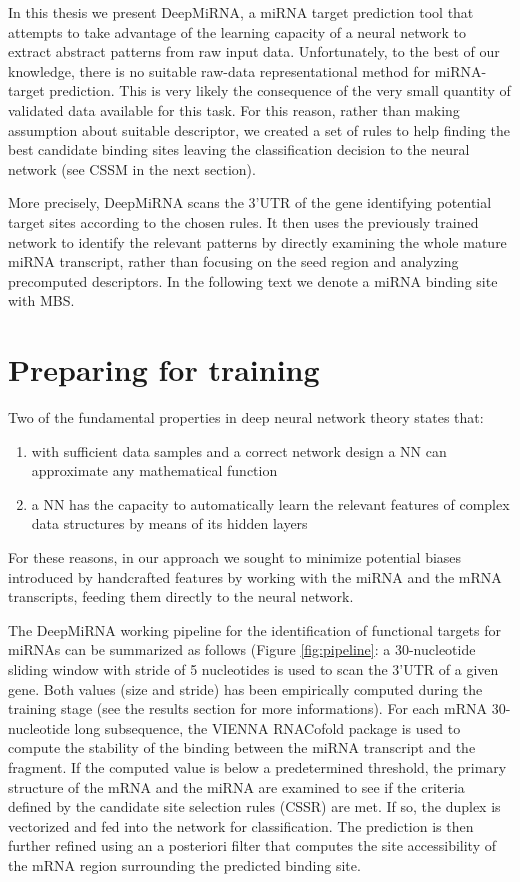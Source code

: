 In this thesis we present DeepMiRNA, a miRNA target prediction tool that attempts to take advantage of the learning capacity of a neural network to extract abstract patterns from raw input data. Unfortunately, to the best of our knowledge, there is no suitable raw-data representational method for miRNA-target prediction. This is very likely the consequence of the very small quantity of validated data available for this task. For this reason, rather than making assumption about suitable descriptor, we created a set of rules to help finding the best candidate binding sites leaving the classification decision to the neural network (see CSSM in the next section). 

More precisely, DeepMiRNA scans the 3'UTR of the gene identifying potential target sites according to the chosen rules. It then uses the previously trained network to identify the relevant patterns by directly examining the whole mature miRNA transcript, rather than focusing on the seed region and analyzing precomputed descriptors. In the following text we denote a miRNA binding site with MBS.

\section{Preparing for training}
Two of the fundamental properties in deep neural network theory states that:

\begin{enumerate}
	\item with sufficient data samples and a correct network design a NN can approximate any mathematical function
	\item a NN has the capacity to automatically learn the relevant features of complex data structures by means of its hidden layers \cite{dl}
\end{enumerate}

For these reasons, in our approach we sought to minimize potential biases introduced by handcrafted features by working  with the miRNA and the mRNA transcripts, feeding them directly to the neural network.

The DeepMiRNA working pipeline for the identification of functional targets for miRNAs can be summarized as follows (Figure \ref{fig:pipeline}: a 30-nucleotide sliding window with stride of 5 nucleotides is used to scan the 3'UTR of a given gene. Both values (size and stride) has been empirically computed during the training stage (see the results section for more informations). For each mRNA 30-nucleotide long subsequence, the VIENNA RNACofold package \cite{vienna_rna} is used to compute the stability of the binding between the miRNA transcript and the fragment. If the computed value is below a predetermined threshold, the primary structure of the mRNA and the miRNA are examined to see if the criteria defined by the candidate site selection rules (CSSR) are met. If so, the duplex is vectorized and fed into the network for classification. The prediction is then further refined using an a posteriori filter that computes the site accessibility of the mRNA region surrounding the predicted binding site. 

